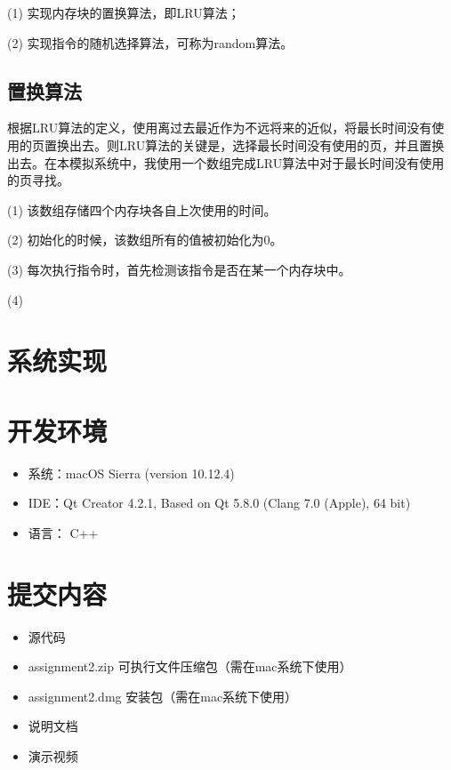 \documentclass{article}
\begin{document}
\begin{CJK}{UTF8}{gbsn}
(1) 实现内存块的置换算法，即LRU算法；

(2) 实现指令的随机选择算法，可称为random算法。

\subsection{置换算法}
根据LRU算法的定义，使用离过去最近作为不远将来的近似，将最长时间没有使用的页置换出去。则LRU算法的关键是，选择最长时间没有使用的页，并且置换出去。在本模拟系统中，我使用一个数组完成LRU算法中对于最长时间没有使用的页寻找。

(1) 该数组存储四个内存块各自上次使用的时间。

(2) 初始化的时候，该数组所有的值被初始化为0。

(3) 每次执行指令时，首先检测该指令是否在某一个内存块中。

(4) 



\vspace{3em}
\section{系统实现}


\vspace{3em}
\section{开发环境}
\begin{itemize}
	\item 系统：macOS Sierra (version 10.12.4)
	\item IDE：Qt Creator 4.2.1, Based on Qt 5.8.0 (Clang 7.0 (Apple), 64 bit)
	\item 语言： C++
\end{itemize}

\vspace{3em}
\section{提交内容}
\begin{itemize}
	\item 源代码
	\item assignment2.zip 可执行文件压缩包（需在mac系统下使用）
	\item assignment2.dmg 安装包（需在mac系统下使用）
	\item 说明文档
	\item 演示视频
\end{itemize}

\end{CJK}
\end{document}
